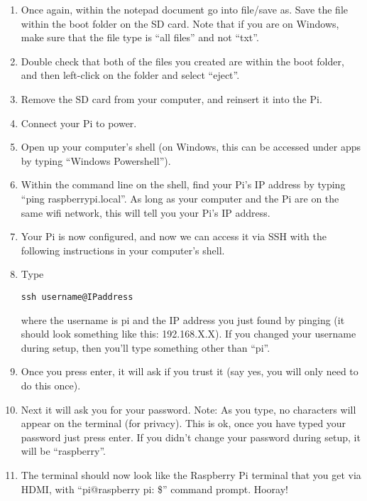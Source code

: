 \documentclass{article}\usepackage[]{graphicx}\usepackage[]{color}
\begin{document}
\begin{enumerate}
\item Once again, within the notepad document go into file/save as.  Save the file within the boot folder on the SD card.  Note that if you are on Windows, make sure that the file type is ``all files'' and not ``txt''.

\item Double check that both of the files you created are within the boot folder, and then left-click on the folder and select ``eject''.  

\item Remove the SD card from your computer, and reinsert it into the Pi.

\item Connect your Pi to power.

\item Open up your computer's shell (on Windows, this can be accessed under apps by typing ``Windows Powershell'').

\item Within the command line on the shell, find your Pi's IP address by typing ``ping raspberrypi.local''.  As long as your computer and the Pi are on the same wifi network, this will tell you your Pi's IP address.

\item Your Pi is now configured, and now we can access it via SSH with the following instructions in your computer's shell.

\item Type

\begin{lstlisting}
ssh username@IPaddress
\end{lstlisting}

where the username is pi and the IP address you just found by pinging (it should look something like this: 192.168.X.X). If you changed your username during setup, then you'll type something other than ``pi''.

\item Once you press enter, it will ask if you trust it (say yes, you will only need to do this once). 

\item Next it will ask you for your password.  Note: As you type, no characters will appear on the terminal (for privacy).  This is ok, once you have typed your password just press enter.  If you didn't change your password during setup, it will be ``raspberry''.

\item The terminal should now look like the Raspberry Pi terminal that you get via HDMI, with ``pi@raspberry pi: \$'' command prompt.  Hooray!


\end{enumerate}
\end{document}
